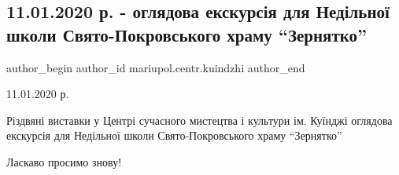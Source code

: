  
 
 
 
 

\subsection{11.01.2020 р. - оглядова екскурсія для Недільної школи Свято-Покровського храму \enquote{Зернятко}}
\label{sec:14_01_2020.fb.mariupol.centr.kuindzhi.2.ogljadova_ekskursia_dlja_nedilnoji_shkoly_svjato_pokrovskogo_hramu_zernjatko}

\ifcmt
 author_begin
   author_id mariupol.centr.kuindzhi
 author_end
\fi

11.01.2020 р.

Різдвяні виставки у Центрі сучасного мистецтва і культури ім. Куїнджі оглядова
екскурсія для Недільної школи Свято-Покровського храму \enquote{Зернятко}

Ласкаво просимо знову!
